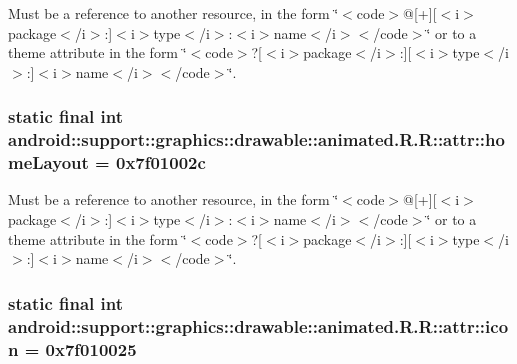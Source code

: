 Must be a reference to another resource, in the form \char`\"{}$<$code$>$@\mbox{[}+\mbox{]}\mbox{[}$<$i$>$package$<$/i$>$:\mbox{]}$<$i$>$type$<$/i$>$:$<$i$>$name$<$/i$>$$<$/code$>$\char`\"{} or to a theme attribute in the form \char`\"{}$<$code$>$?\mbox{[}$<$i$>$package$<$/i$>$:\mbox{]}\mbox{[}$<$i$>$type$<$/i$>$:\mbox{]}$<$i$>$name$<$/i$>$$<$/code$>$\char`\"{}. \hypertarget{classandroid_1_1support_1_1graphics_1_1drawable_1_1animated_1_1_r_1_1attr_24d842d62fe1f2c7880c3a2b08458c6c}{
\subsubsection[{homeLayout}]{\setlength{\rightskip}{0pt plus 5cm}static final int android::support::graphics::drawable::animated.R.R::attr::homeLayout = 0x7f01002c}}
\label{classandroid_1_1support_1_1graphics_1_1drawable_1_1animated_1_1_r_1_1attr_24d842d62fe1f2c7880c3a2b08458c6c}


Must be a reference to another resource, in the form \char`\"{}$<$code$>$@\mbox{[}+\mbox{]}\mbox{[}$<$i$>$package$<$/i$>$:\mbox{]}$<$i$>$type$<$/i$>$:$<$i$>$name$<$/i$>$$<$/code$>$\char`\"{} or to a theme attribute in the form \char`\"{}$<$code$>$?\mbox{[}$<$i$>$package$<$/i$>$:\mbox{]}\mbox{[}$<$i$>$type$<$/i$>$:\mbox{]}$<$i$>$name$<$/i$>$$<$/code$>$\char`\"{}. \hypertarget{classandroid_1_1support_1_1graphics_1_1drawable_1_1animated_1_1_r_1_1attr_f96e087f86650a431d5cfac76d2edc39}{
\subsubsection[{icon}]{\setlength{\rightskip}{0pt plus 5cm}static final int android::support::graphics::drawable::animated.R.R::attr::icon = 0x7f010025}}
\label{classandroid_1_1support_1_1graphics_1_1drawable_1_1animated_1_1_r_1_1attr_f96e087f86650a431d5cfac76d2edc39}


